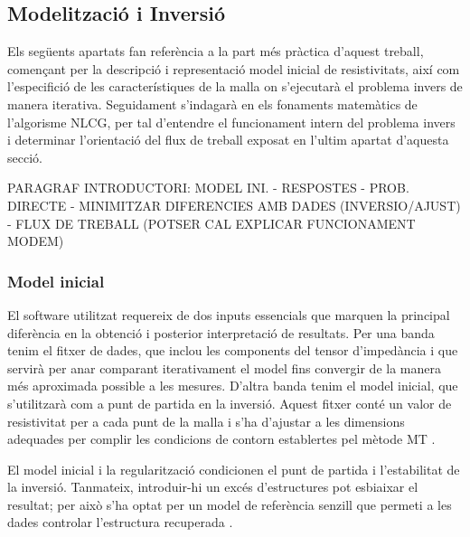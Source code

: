 \documentclass[11pt,a4paper,oneside]{article}
\begin{document}
\subsection{Modelització i Inversió}


Els següents apartats fan referència a la part més pràctica d'aquest treball, començant per la descripció i representació model inicial de resistivitats, així com l'especifició de les característiques de la malla on s'ejecutarà el problema invers de manera iterativa. Seguidament s'indagarà en els fonaments matemàtics de l'algorisme NLCG, per tal d'entendre el funcionament intern del problema invers i determinar l'orientació del flux de treball exposat en l'ultim apartat d'aquesta secció. 


PARAGRAF INTRODUCTORI: MODEL INI. - RESPOSTES - PROB. DIRECTE - MINIMITZAR DIFERENCIES AMB DADES (INVERSIO/AJUST)  - FLUX DE TREBALL
(POTSER CAL EXPLICAR FUNCIONAMENT MODEM)

\subsubsection{Model inicial}

El software utilitzat requereix de dos inputs essencials que marquen la principal diferència en la obtenció i posterior interpretació de resultats. Per una banda tenim el fitxer de dades, que inclou les components del tensor d’impedància i que servirà per anar comparant iterativament el model fins convergir de la manera més aproximada possible a les mesures. D’altra banda tenim el model inicial, que s’utilitzarà com a punt de partida en la inversió. Aquest fitxer conté un valor de resistivitat per a cada punt de la malla i s’ha d’ajustar a les dimensions adequades per complir les condicions de contorn establertes pel mètode MT \citep{chavejones2012}.


\vspace{5pt}


El model inicial i la regularització condicionen el punt de partida i l'estabilitat de la inversió. Tanmateix, introduir-hi un excés d'estructures pot esbiaixar el resultat; per això s'ha optat per un model de referència senzill que permeti a les dades controlar l'estructura recuperada \citep{egbert2014}.

\vspace{5pt}
\end{document}
